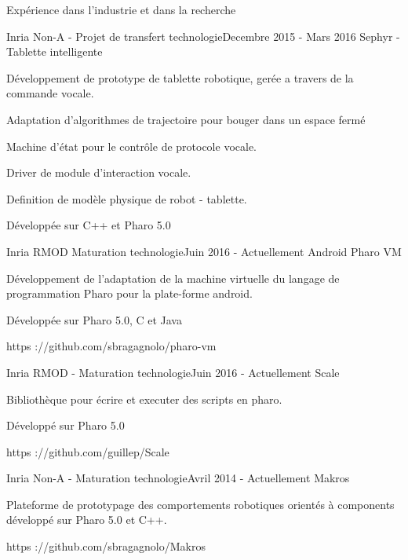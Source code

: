 \documentclass{resume} %
\begin{document}
\begin{rSection}{Exp\'{e}rience dans l'industrie et dans la recherche}
	\begin{rSubsection}{Inria Non-A - Projet de transfert technologie}{Decembre 2015 - Mars 2016 }{Sephyr - Tablette intelligente }
		\item 
		\item D\'{e}veloppement de prototype de tablette robotique, ger\'{e}e a travers de la commande vocale. 
		\item Adaptation d'algorithmes de trajectoire pour bouger dans un espace ferm\'{e}
		\item Machine d'\'{e}tat pour le contr\^ole de protocole vocale. 
		\item Driver de module d'interaction vocale.  
		\item Definition de mod\`ele physique de robot - tablette. 
		\item D\'{e}velopp\'{e}e sur C++ et Pharo 5.0
	\end{rSubsection}
	
	\begin{rSubsection}{Inria RMOD Maturation technologie}{Juin 2016 - Actuellement }{Android Pharo VM}
		\item		
		\item D\'{e}veloppement de l'adaptation de la  machine virtuelle du langage de programmation Pharo pour la plate-forme android.
		\item D\'{e}velopp\'{e}e sur Pharo 5.0, C et Java
 		\item https ://github.com/sbragagnolo/pharo-vm		
	\end{rSubsection}
	
	\begin{rSubsection}{Inria RMOD - Maturation technologie}{Juin 2016 - Actuellement }{Scale}
		\item 
		\item Biblioth\`eque pour \'ecrire et executer des scripts en pharo. 
		\item D\'{e}velopp\'{e} sur Pharo 5.0 
		\item https ://github.com/guillep/Scale		
	\end{rSubsection}
	
	\begin{rSubsection}{Inria Non-A - Maturation technologie}{Avril 2014 - Actuellement }{Makros}
		\item 
		\item Plateforme de prototypage des comportements robotiques orient\'{e}s \`a components d\'{e}velopp\'{e} sur Pharo 5.0 et C++.
		\item https ://github.com/sbragagnolo/Makros		
	\end{rSubsection}
	

\end{rSection}
\end{document}
